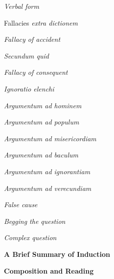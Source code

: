 \documentclass{report}
\begin{document}
\begin{outline}
\begin{outline}
\begin{outline}
    \item \textit{Verbal form}
    \end{outline}
  \item Fallacies \textit{extra dictionem}
      \begin{outline}
    \item \textit{Fallacy of accident}
    \item \textit{Secundum quid}
    \item \textit{Fallacy of consequent}
    \item \textit{Ignoratio elenchi}
      \begin{outline}
        \item \textit{Argumentum ad hominem}
        \item \textit{Argumentum ad populum}
        \item \textit{Argumentum ad misericordiam}
        \item \textit{Argumentum ad baculum}
        \item \textit{Argumentum ad ignorantiam}
        \item \textit{Argumentum ad verecundiam}
      \end{outline}
    \item \textit{False cause}
    \item \textit{Begging the question}
    \item \textit{Complex question}
    \end{outline}
  \end{outline}
    \item {\bf A Brief Summary of Induction}
  \item {\bf Composition and Reading}
\end{outline}
\end{document}
